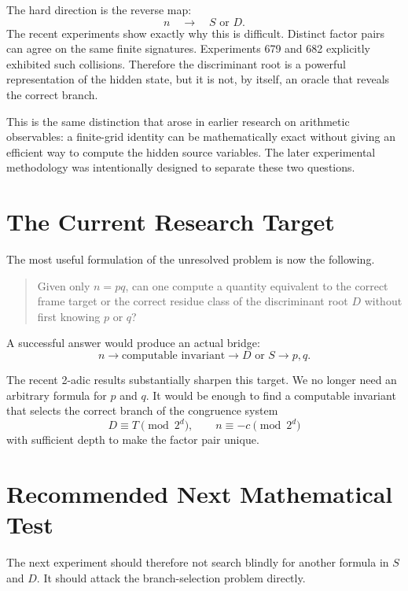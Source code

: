 \documentclass[11pt,a4paper]{article}
\begin{document}
The hard direction is the reverse map:
\[
 n\quad\longrightarrow\quad S\text{ or }D.
\]
The recent experiments show exactly why this is difficult.  Distinct factor pairs can agree on the same finite signatures.  Experiments 679 and 682 explicitly exhibited such collisions.  Therefore the discriminant root is a powerful representation of the hidden state, but it is not, by itself, an oracle that reveals the correct branch.

This is the same distinction that arose in earlier research on arithmetic observables: a finite-grid identity can be mathematically exact without giving an efficient way to compute the hidden source variables.  The later experimental methodology was intentionally designed to separate these two questions.

\section{The Current Research Target}

The most useful formulation of the unresolved problem is now the following.

\begin{quote}
Given only $n=pq$, can one compute a quantity equivalent to the correct frame target or the correct residue class of the discriminant root $D$ without first knowing $p$ or $q$?
\end{quote}

A successful answer would produce an actual bridge:
\begin{equation}
 n
\longrightarrow
\text{computable invariant}
\longrightarrow
D\text{ or }S
\longrightarrow
p,q.
\end{equation}

The recent 2-adic results substantially sharpen this target.  We no longer need an arbitrary formula for $p$ and $q$.  It would be enough to find a computable invariant that selects the correct branch of the congruence system
\[
 D\equiv T\pmod{2^d},
 \qquad
 n\equiv-c\pmod{2^d}
\]
with sufficient depth to make the factor pair unique.

\section{Recommended Next Mathematical Test}

The next experiment should therefore not search blindly for another formula in $S$ and $D$.  It should attack the branch-selection problem directly.
\end{document}
